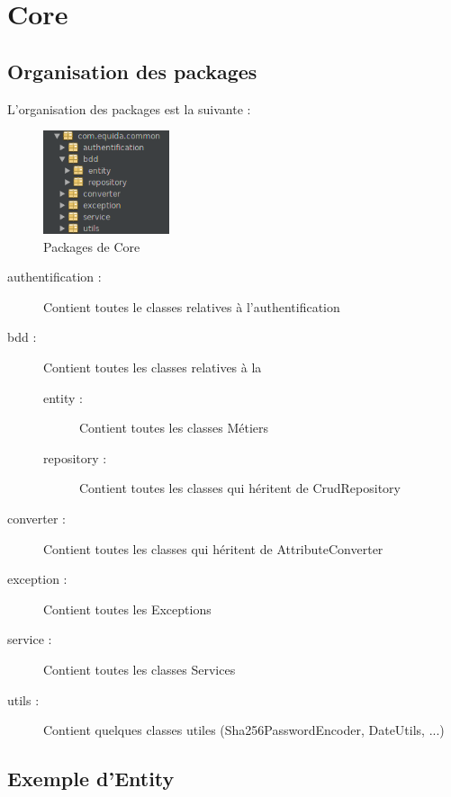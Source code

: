 \chapter{Core}
	\section{Organisation des packages}

		L'organisation des packages est la suivante :

		\begin{figure}[H]
			\centering\includegraphics[width=0.33\textwidth, keepaspectratio]{res/core-package.png}
			\caption{Packages de Core}
		\end{figure}

		\begin{description}
			\item[authentification :]{Contient toutes le classes relatives à l'authentification}
			\item[bdd :]{Contient toutes les classes relatives à la \bdd{}}

			\begin{description}
				\item[entity :]{Contient toutes les classes Métiers}
				\item[repository :]{Contient toutes les classes qui héritent de CrudRepository}
			\end{description}

			\item[converter :]{Contient toutes les classes qui héritent de AttributeConverter}
			\item[exception :]{Contient toutes les Exceptions}
			\item[service :]{Contient toutes les classes Services}
			\item[utils :]{Contient quelques classes utiles (Sha256PasswordEncoder, DateUtils, ...)}
		\end{description}

	\section{Exemple d'Entity}

